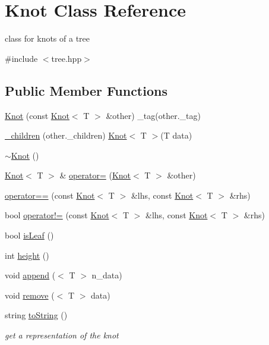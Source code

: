 \hypertarget{class_knot}{\section{Knot Class Reference}
\label{class_knot}
}


class for knots of a tree  




{\ttfamily \#include $<$tree.\-hpp$>$}

\subsection*{Public Member Functions}
\begin{DoxyCompactItemize}
\item 
\hyperlink{class_knot_a92883dc27430396af88d6e8a0b216d7d}{Knot} (const \hyperlink{class_knot}{Knot}$<$ T $>$ \&other) \-\_\-tag(other.\-\_\-tag)
\item 
\hyperlink{class_knot_a4fbe6a4a6f834298c0972a11c49a100c}{\-\_\-children} (other.\-\_\-children) \hyperlink{class_knot}{Knot}$<$ T $>$(T data)
\item 
\hyperlink{class_knot_abe4462897569b79486b2b6cac03c3702}{$\sim$\-Knot} ()
\item 
\hyperlink{class_knot}{Knot}$<$ T $>$ \& \hyperlink{class_knot_a2229333e1b081402213d600dd7c3b43d}{operator=} (\hyperlink{class_knot}{Knot}$<$ T $>$ \&other)
\item 
\hyperlink{class_knot_a37de81d6b6172c19435fcf0f11658bc3}{operator==} (const \hyperlink{class_knot}{Knot}$<$ T $>$ \&lhs, const \hyperlink{class_knot}{Knot}$<$ T $>$ \&rhs)
\item 
bool \hyperlink{class_knot_a9d051c01a870a9071e4adede8d79af65}{operator!=} (const \hyperlink{class_knot}{Knot}$<$ T $>$ \&lhs, const \hyperlink{class_knot}{Knot}$<$ T $>$ \&rhs)
\item 
bool \hyperlink{class_knot_a68386ab11edd866495dfbcf61cab0e01}{is\-Leaf} ()
\item 
int \hyperlink{class_knot_a9988255f899344c9f16797c4b918ac7b}{height} ()
\item 
void \hyperlink{class_knot_aa941112b1a0d38362bc4a1f632ecd35f}{append} ($<$ T $>$ n\-\_\-data)
\item 
void \hyperlink{class_knot_a96d632680a9180028a743cb9c36999fd}{remove} ($<$ T $>$ data)
\item 
string \hyperlink{class_knot_af8b780d91b4f2a43556c7b53c8f6243c}{to\-String} ()
\begin{DoxyCompactList}\small\item\em get a representation of the knot \end{DoxyCompactList}\end{DoxyCompactItemize}


